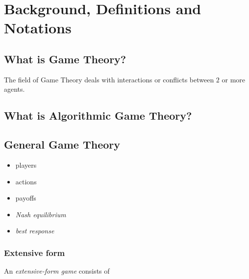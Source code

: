 \chapter{Background, Definitions and Notations}

\section{What is Game Theory?}

The field of Game Theory deals with interactions or conflicts between $2$ or more agents.
\todo

\section{What is Algorithmic Game Theory?}
\todo

\section{General Game Theory}

\begin{itemize}
  \item players
  \item actions
  \item payoffs
  \item \emph{Nash equilibrium}
  \item \emph{best response}
\end{itemize}

\subsection{Extensive form}

An \emph{extensive-form game} consists of

